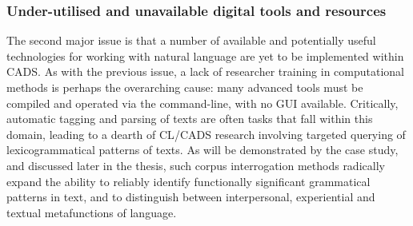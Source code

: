 
\subsubsection{Under-utilised and unavailable digital tools and resources} 

The second major issue is that a number of available and potentially useful technologies for working with natural language are yet to be implemented within \gls{CADS}. As with the previous issue, a lack of researcher training in computational methods is perhaps the overarching cause: many advanced tools must be compiled and operated via the command\hyp{}line, with no \gls{GUI} available. Critically, automatic tagging and parsing of texts are often tasks that fall within this domain, leading to a dearth of \gls{CL}\slash \gls{CADS} research involving targeted querying of lexicogrammatical patterns of texts. As will be demonstrated by the case study, and discussed later in the thesis, such corpus interrogation methods radically expand the ability to reliably identify functionally significant grammatical patterns in text, and to distinguish between interpersonal, experiential and textual metafunctions of language.

